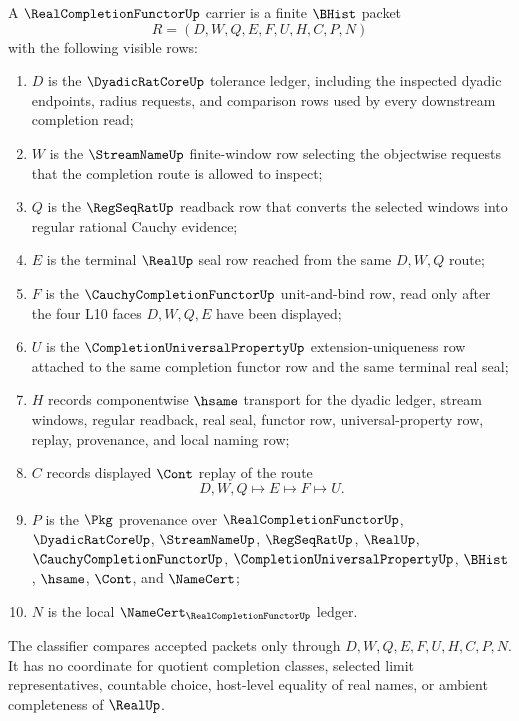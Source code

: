 \begin{definition}
\label{def:real-completion-functor-carrier}
A $\RealCompletionFunctorUp$ carrier is a finite $\BHist$ packet
$$
R=(D,W,Q,E,F,U,H,C,P,N)
$$
with the following visible rows:
\begin{enumerate}
\item $D$ is the $\DyadicRatCoreUp$ tolerance ledger, including the inspected dyadic endpoints, radius requests, and comparison rows used by every downstream completion read;
\item $W$ is the $\StreamNameUp$ finite-window row selecting the objectwise requests that the completion route is allowed to inspect;
\item $Q$ is the $\RegSeqRatUp$ readback row that converts the selected windows into regular rational Cauchy evidence;
\item $E$ is the terminal $\RealUp$ seal row reached from the same $D,W,Q$ route;
\item $F$ is the $\CauchyCompletionFunctorUp$ unit-and-bind row, read only after the four L10 faces $D,W,Q,E$ have been displayed;
\item $U$ is the $\CompletionUniversalPropertyUp$ extension-uniqueness row attached to the same completion functor row and the same terminal real seal;
\item $H$ records componentwise $\hsame$ transport for the dyadic ledger, stream windows, regular readback, real seal, functor row, universal-property row, replay, provenance, and local naming row;
\item $C$ records displayed $\Cont$ replay of the route
$$
D,W,Q \longmapsto E \longmapsto F \longmapsto U .
$$
\item $P$ is the $\Pkg$ provenance over $\RealCompletionFunctorUp$, $\DyadicRatCoreUp$, $\StreamNameUp$, $\RegSeqRatUp$, $\RealUp$, $\CauchyCompletionFunctorUp$, $\CompletionUniversalPropertyUp$, $\BHist$, $\hsame$, $\Cont$, and $\NameCert$;
\item $N$ is the local $\NameCert_{\RealCompletionFunctorUp}$ ledger.
\end{enumerate}
The classifier compares accepted packets only through $D,W,Q,E,F,U,H,C,P,N$. It has no coordinate for quotient completion classes, selected limit representatives, countable choice, host-level equality of real names, or ambient completeness of $\RealUp$.
\end{definition}

